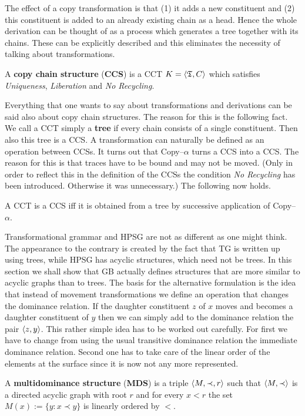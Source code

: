 The effect of a copy transformation is that (1) it adds a new
constituent and (2) this constituent is added to an already
existing chain as a head. Hence the whole derivation can be
thought of as a process which generates a tree together with
its chains. These can be explicitly described and this eliminates
the necessity of talking about transformations.
\begin{defn}
A \textbf{copy chain structure} (\textbf{CCS}) is a CCT
$K = \langle \mathfrak{T}, C\rangle$ which satisfies {\sl Uniqueness},
{\sl Liberation} and {\sl No Recycling}.
\end{defn}
Everything that one wants to say about transformations and
derivations can be said also about copy chain structures.
The reason for this is the following fact. We call a CCT
simply a \textbf{tree} if every chain consists of a single
constituent. Then also this tree is a CCS.
A transformation can naturally be defined as an operation
between CCSs. It turns out that Copy--$\alpha$
turns a CCS into a CCS. The reason for this is that traces
have to be bound and may not be moved.  (Only in order to
reflect this in the definition of the CCSs the condition
{\sl No Recycling\/} has been introduced. Otherwise it was
unnecessary.) The following now holds.
\begin{thm}
A CCT is a CCS iff it is obtained from a tree by
successive application of Copy--$\alpha$.
\end{thm}
Transformational grammar and HPSG are not as different as one
might think. The appearance to the contrary is created by the fact
that TG is written up using trees, while HPSG has acyclic
structures, which need not be trees. In this section we shall show
that GB actually defines structures that are more similar to
acyclic graphs than to trees. The basis for the alternative
formulation is the idea that instead of movement transformations
we define an operation that changes the dominance relation. If the
daughter constituent $z$ of $x$ moves and becomes a daughter
constituent of $y$ then we can simply add to the dominance
relation the pair $\langle z,y\rangle$. This rather simple idea has to be
worked out carefully. For first we have to change from using the
usual transitive dominance relation the immediate dominance
relation. Second one has to take care of the linear order of the
elements at the surface since it is now not any more represented.
\begin{defn}
A \textbf{multidominance structure} (\textbf{MDS}) is a triple 
$\langle M, \prec, r\rangle$ such that
$\langle M, \prec\rangle$ is a directed acyclic graph with root
$r$ and for every $x < r$ the set $M(x) := \{y : x \prec y\}$
is linearly ordered by $<$.
\end{defn}
